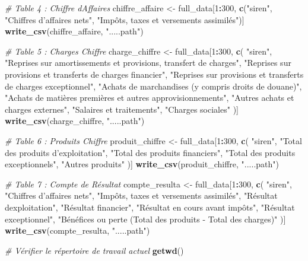 \documentclass[mstat,12pt]{unswthesis}
\newenvironment{Shaded}{\begin{snugshade}}{\end{snugshade}}
\newcommand{\CommentTok}[1]{\textcolor[rgb]{0.56,0.35,0.01}{\textit{#1}}}
\newcommand{\DecValTok}[1]{\textcolor[rgb]{0.00,0.00,0.81}{#1}}
\newcommand{\FunctionTok}[1]{\textcolor[rgb]{0.13,0.29,0.53}{\textbf{#1}}}
\newcommand{\NormalTok}[1]{#1}
\newcommand{\OtherTok}[1]{\textcolor[rgb]{0.56,0.35,0.01}{#1}}
\newcommand{\SpecialCharTok}[1]{\textcolor[rgb]{0.81,0.36,0.00}{\textbf{#1}}}
\newcommand{\StringTok}[1]{\textcolor[rgb]{0.31,0.60,0.02}{#1}}
\begin{document}
\begin{Shaded}
\begin{Highlighting}[]
\CommentTok{\# Table 4 : Chiffre d\textquotesingle{}Affaires}
\NormalTok{chiffre\_affaire }\OtherTok{\textless{}{-}}\NormalTok{ full\_data[}\DecValTok{1}\SpecialCharTok{:}\DecValTok{300}\NormalTok{, }\FunctionTok{c}\NormalTok{(}\StringTok{"siren"}\NormalTok{, }\StringTok{"Chiffres d’affaires nets"}\NormalTok{, }\StringTok{"Impôts, taxes et versements assimilés"}\NormalTok{)]}
\FunctionTok{write\_csv}\NormalTok{(chiffre\_affaire, }\StringTok{".....path"}\NormalTok{)}

\CommentTok{\# Table 5 : Charges Chiffre}
\NormalTok{charge\_chiffre }\OtherTok{\textless{}{-}}\NormalTok{ full\_data[}\DecValTok{1}\SpecialCharTok{:}\DecValTok{300}\NormalTok{, }\FunctionTok{c}\NormalTok{(}
  \StringTok{"siren"}\NormalTok{, }
  \StringTok{"Reprises sur amortissements et provisions, transfert de charges"}\NormalTok{, }
  \StringTok{"Reprises sur provisions et transferts de charges financier"}\NormalTok{, }
  \StringTok{"Reprises sur provisions et transferts de charges exceptionnel"}\NormalTok{, }
  \StringTok{"Achats de marchandises (y compris droits de douane)"}\NormalTok{, }
  \StringTok{"Achats de matières premières et autres approvisionnements"}\NormalTok{, }
  \StringTok{"Autres achats et charges externes"}\NormalTok{, }
  \StringTok{"Salaires et traitements"}\NormalTok{, }
  \StringTok{"Charges sociales"}
\NormalTok{)]}
\FunctionTok{write\_csv}\NormalTok{(charge\_chiffre, }\StringTok{".....path"}\NormalTok{)}

\CommentTok{\# Table 6 : Produits Chiffre}
\NormalTok{produit\_chiffre }\OtherTok{\textless{}{-}}\NormalTok{ full\_data[}\DecValTok{1}\SpecialCharTok{:}\DecValTok{300}\NormalTok{, }\FunctionTok{c}\NormalTok{(}
  \StringTok{"siren"}\NormalTok{, }
  \StringTok{"Total des produits d’exploitation"}\NormalTok{, }
  \StringTok{"Total des produits financiers"}\NormalTok{, }
  \StringTok{"Total des produits exceptionnels"}\NormalTok{, }
  \StringTok{"Autres produits"}
\NormalTok{)]}
\FunctionTok{write\_csv}\NormalTok{(produit\_chiffre, }\StringTok{".....path"}\NormalTok{)}

\CommentTok{\# Table 7 : Compte de Résultat}
\NormalTok{compte\_resulta }\OtherTok{\textless{}{-}}\NormalTok{ full\_data[}\DecValTok{1}\SpecialCharTok{:}\DecValTok{300}\NormalTok{, }\FunctionTok{c}\NormalTok{(}
  \StringTok{"siren"}\NormalTok{, }
  \StringTok{"Chiffres d’affaires nets"}\NormalTok{, }
  \StringTok{"Impôts, taxes et versements assimilés"}\NormalTok{, }
  \StringTok{"Résultat d\textquotesingle{}exploitation"}\NormalTok{, }
  \StringTok{"Résultat financier"}\NormalTok{, }
  \StringTok{"Résultat en cours avant impôts"}\NormalTok{, }
  \StringTok{"Résultat exceptionnel"}\NormalTok{, }
  \StringTok{"Bénéfices ou perte (Total des produits {-} Total des charges)"}
\NormalTok{)]}
\FunctionTok{write\_csv}\NormalTok{(compte\_resulta, }\StringTok{".....path"}\NormalTok{)}

\CommentTok{\# Vérifier le répertoire de travail actuel}
\FunctionTok{getwd}\NormalTok{()}
\end{Highlighting}
\end{Shaded}
\end{document}
